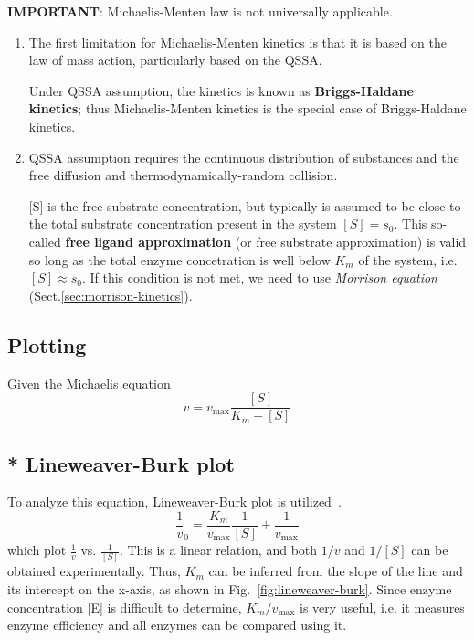 {\bf IMPORTANT}: Michaelis-Menten law is not universally applicable.
\begin{enumerate}
  \item The first limitation for Michaelis-Menten kinetics is that it is
  based on the law of mass action, particularly based on the
  QSSA. 
  
 Under QSSA assumption, the kinetics is known as
  {\bf Briggs-Haldane kinetics}; thus Michaelis-Menten kinetics is the
  special case of Briggs-Haldane kinetics.
  
  \item QSSA assumption requires the continuous distribution of
  substances and the free diffusion and thermodynamically-random
  collision. 

[S] is the free substrate concentration, but typically is
  assumed to be close to the total substrate concentration present in
  the system $[S] = s_0$. This so-called {\bf free ligand approximation} (or
  free substrate approximation) is valid so long as the total enzyme
  concetration is well below $K_m$ of the system, i.e. $[S]\approx
  s_0$. If this condition is not met, we need to use
  {\it Morrison equation} (Sect.\ref{sec:morrison-kinetics}).

\end{enumerate}

\subsection{Plotting}
\label{sec:plotting}

Given the Michaelis equation
\begin{equation}
  \label{eq:321}
  v = v_\max \frac{[S]}{K_m+[S]}
\end{equation}

\subsection{* Lineweaver-Burk plot}
\label{sec:Lineweaver-Burk-plot}

To analyze this equation, Lineweaver-Burk plot is
utilized~\citep{lineweaver1934edc}. 
\begin{equation}
  \label{eq:322}
  \frac{1}{v}_0 = \frac{K_m}{v_\max}\frac{1}{[S]} + \frac{1}{v_\max}
\end{equation}
which plot $\frac{1}{v}$ vs. $\frac{1}{[S]}$. This is a linear
relation, and both $1/v$ and $1/[S]$ can be obtained
experimentally. Thus, $K_m$ can be inferred from the slope of the
line and its intercept on the x-axis, as shown in
Fig.~\ref{fig:lineweaver-burk}. Since enzyme concentration [E] is
difficult to determine, $K_m/v_\max$ is very useful, i.e. it measures
enzyme efficiency and all enzymes can be compared using it. 

